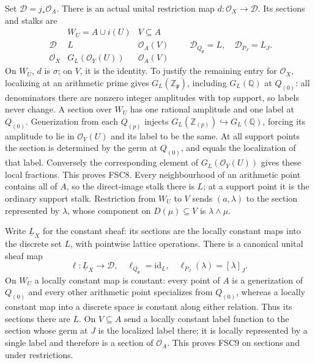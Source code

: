 Set $\mathcal D=j_*\mathcal O_A$. There is an actual unital restriction
map $d:\mathcal O_X\to\mathcal D$. Its sections and stalks are
\begin{equation}\tag{FSC8}
 \begin{array}{c|cc}
 &W_U=A\cup i(U)&V\subseteq A\\ \hline
 \mathcal D&L&\mathcal O_A(V)\\
 \mathcal O_X&G_L(\mathcal O_Y(U))&\mathcal O_A(V)
 \end{array}
 \qquad
 \mathcal D_{Q_{\mathfrak p}}=L,\quad\mathcal D_{P_J}=L_J.
\end{equation}
On $W_U$, $d$ is $\sigma$; on $V$, it is the identity.
To justify the remaining entry for $\mathcal O_X$, localizing at an
arithmetic prime gives $G_L(\mathbb Z_{\mathfrak p})$, including
$G_L(\mathbb Q)$ at $Q_{(0)}$: all denominators there are nonzero
integer amplitudes with top support, so labels never change. A section
over $W_U$ has one rational amplitude and one label at $Q_{(0)}$.
Generization from each $Q_{(p)}$ injects
$G_L(\mathbb Z_{(p)})\hookrightarrow G_L(\mathbb Q)$, forcing its
amplitude to lie in $\mathcal O_Y(U)$ and its label to be the same.
At all support points the section is determined by the germ at
$Q_{(0)}$, and equals the localization of that label. Conversely the
corresponding element of $G_L(\mathcal O_Y(U))$ gives these local
fractions. This proves FSC8. Every neighbourhood of an arithmetic
point contains all of $A$, so the direct-image stalk there is $L$;
at a support point it is the ordinary support stalk. Restriction
from $W_U$ to $V$ sends $(a,\lambda)$ to the section represented by
$\lambda$, whose component on $D(\mu)\subseteq V$ is
$\lambda\wedge\mu$.

Write $\underline L_X$ for the constant sheaf: its sections are the
locally constant maps into the discrete set $L$, with pointwise lattice
operations. There is a canonical unital sheaf map
\begin{equation}\tag{FSC9}
 \ell:\underline L_X\longrightarrow\mathcal D,
 \quad \ell_{Q_{\mathfrak p}}=\mathrm{id}_L,
 \quad \ell_{P_J}(\lambda)=[\lambda]_J.
\end{equation}
On $W_U$ a locally constant map is constant: every point of $A$ is a
generization of $Q_{(0)}$ and every other arithmetic point specializes
from $Q_{(0)}$, whereas a locally constant map into a discrete space
is constant along either relation. Thus its sections there are $L$.
On $V\subseteq A$ send a locally constant label function to the
section whose germ at $J$ is the localized label there; it is locally
represented by a single label and therefore is a section of $\mathcal
O_A$. This proves FSC9 on sections and under restrictions.

